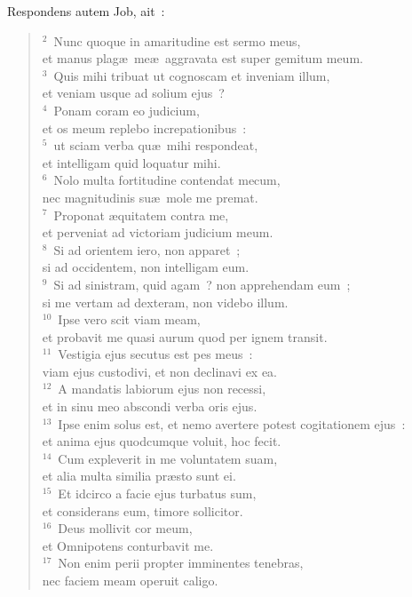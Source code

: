 \lettrine[lines=3,image=true,loversize=0.05,lraise=-0.03]{R}{}espondens autem Job, ait~:
\begin{flushleft}\begin{verse}\vspace{6pt}${}^{2}$~Nunc quoque in amaritudine est sermo meus,\\ et manus plag\ae\ me\ae\ aggravata est super gemitum meum.\\
${}^{3}$~Quis mihi tribuat ut cognoscam et inveniam illum,\\ et veniam usque ad solium ejus~?\\
${}^{4}$~Ponam coram eo judicium,\\ et os meum replebo increpationibus~:\\
${}^{5}$~ut sciam verba qu\ae\ mihi respondeat,\\ et intelligam quid loquatur mihi.\\
${}^{6}$~Nolo multa fortitudine contendat mecum,\\ nec magnitudinis su\ae\ mole me premat.\\
${}^{7}$~Proponat \ae quitatem contra me,\\ et perveniat ad victoriam judicium meum.\\
${}^{8}$~Si ad orientem iero, non apparet~;\\ si ad occidentem, non intelligam eum.\\
${}^{9}$~Si ad sinistram, quid agam~? non apprehendam eum~;\\ si me vertam ad dexteram, non videbo illum.\\
${}^{10}$~Ipse vero scit viam meam,\\ et probavit me quasi aurum quod per ignem transit.\\
${}^{11}$~Vestigia ejus secutus est pes meus~:\\ viam ejus custodivi, et non declinavi ex ea.\\
${}^{12}$~A mandatis labiorum ejus non recessi,\\ et in sinu meo abscondi verba oris ejus.\\
${}^{13}$~Ipse enim solus est, et nemo avertere potest cogitationem ejus~:\\ et anima ejus quodcumque voluit, hoc fecit.\\
${}^{14}$~Cum expleverit in me voluntatem suam,\\ et alia multa similia pr\ae sto sunt ei.\\
${}^{15}$~Et idcirco a facie ejus turbatus sum,\\ et considerans eum, timore sollicitor.\\
${}^{16}$~Deus mollivit cor meum,\\ et Omnipotens conturbavit me.\\
${}^{17}$~Non enim perii propter imminentes tenebras,\\ nec faciem meam operuit caligo.\end{verse}\end{flushleft}


